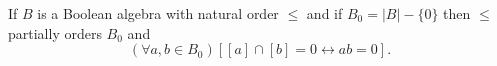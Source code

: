 If $B$ is a Boolean algebra with natural order $\leq$ and if $B_0 = |B| - \{0\}$ then $\leq$ partially orders $B_0$ and
$$(\forall a, b \in B_0)[[a] \cap [b] = 0 \leftrightarrow ab = 0].$$
